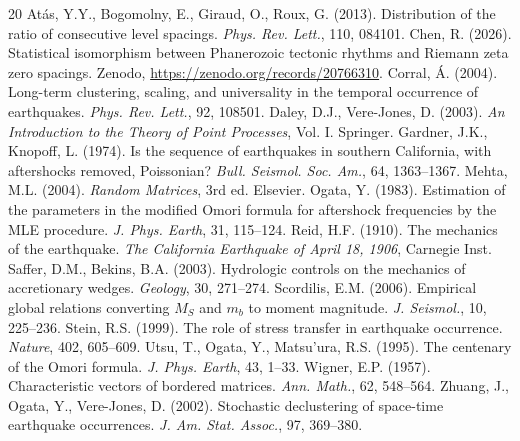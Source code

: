 \documentclass[12pt,a4paper]{article}
\begin{document}
\begin{thebibliography}{20}
 At\'as, Y.Y., Bogomolny, E., Giraud, O., Roux, G. (2013). Distribution of the ratio of consecutive level spacings. \textit{Phys. Rev. Lett.}, 110, 084101.
 Chen, R. (2026). Statistical isomorphism between Phanerozoic tectonic rhythms and Riemann zeta zero spacings. Zenodo, \url{https://zenodo.org/records/20766310}.
 Corral, \'A. (2004). Long-term clustering, scaling, and universality in the temporal occurrence of earthquakes. \textit{Phys. Rev. Lett.}, 92, 108501.
 Daley, D.J., Vere-Jones, D. (2003). \textit{An Introduction to the Theory of Point Processes}, Vol. I. Springer.
 Gardner, J.K., Knopoff, L. (1974). Is the sequence of earthquakes in southern California, with aftershocks removed, Poissonian? \textit{Bull. Seismol. Soc. Am.}, 64, 1363--1367.
 Mehta, M.L. (2004). \textit{Random Matrices}, 3rd ed. Elsevier.
 Ogata, Y. (1983). Estimation of the parameters in the modified Omori formula for aftershock frequencies by the MLE procedure. \textit{J. Phys. Earth}, 31, 115--124.
 Reid, H.F. (1910). The mechanics of the earthquake. \textit{The California Earthquake of April 18, 1906}, Carnegie Inst.
 Saffer, D.M., Bekins, B.A. (2003). Hydrologic controls on the mechanics of accretionary wedges. \textit{Geology}, 30, 271--274.
 Scordilis, E.M. (2006). Empirical global relations converting $M_S$ and $m_b$ to moment magnitude. \textit{J. Seismol.}, 10, 225--236.
 Stein, R.S. (1999). The role of stress transfer in earthquake occurrence. \textit{Nature}, 402, 605--609.
 Utsu, T., Ogata, Y., Matsu'ura, R.S. (1995). The centenary of the Omori formula. \textit{J. Phys. Earth}, 43, 1--33.
 Wigner, E.P. (1957). Characteristic vectors of bordered matrices. \textit{Ann. Math.}, 62, 548--564.
 Zhuang, J., Ogata, Y., Vere-Jones, D. (2002). Stochastic declustering of space-time earthquake occurrences. \textit{J. Am. Stat. Assoc.}, 97, 369--380.
\end{thebibliography}
\end{document}
